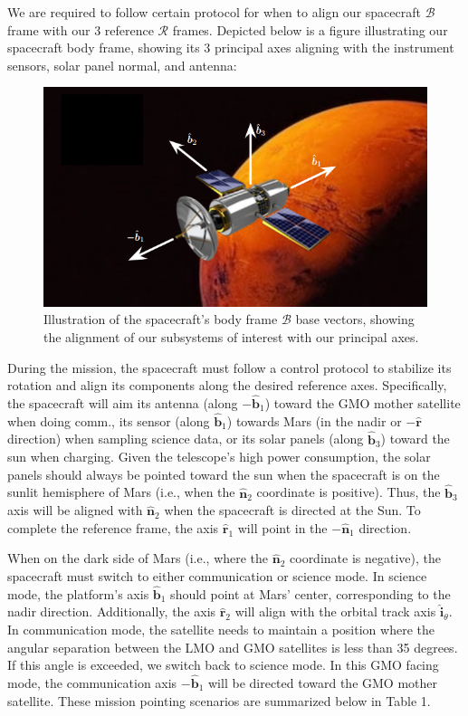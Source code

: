 \documentclass[conf]{new-aiaa}
\begin{document}
We are required to follow certain protocol for when to align our spacecraft $\mathcal{B}$ frame with our 3 reference $\mathcal{R}$ frames. Depicted below is a figure illustrating our spacecraft body frame, showing its 3 principal axes aligning with the instrument sensors, solar panel normal, and antenna:
\begin{figure}[H]
    \centering
    \captionsetup{width=.7\linewidth}
    \includegraphics[width=.75\linewidth]{fig2.png}
    \caption{Illustration of the spacecraft's body frame $\mathcal{B}$ base vectors, showing the alignment of our subsystems of interest with our principal axes.}
    \label{fig:enter-label}
\end{figure}
During the mission, the spacecraft must follow a control protocol to stabilize its rotation and align its components along the desired reference axes. Specifically, the spacecraft will aim its antenna (along \( -\hat{\bm{b}}_1 \)) toward the GMO mother satellite when doing comm., its sensor (along \( \hat{\bm{b}}_1 \)) towards Mars (in the nadir or \( -\hat{\bm{r}} \) direction) when sampling science data, or its solar panels (along \( \hat{\bm{b}}_3 \)) toward the sun when charging. Given the telescope's high power consumption, the solar panels should always be pointed toward the sun when the spacecraft is on the sunlit hemisphere of Mars (i.e., when the \( \hat{\bm{n}}_2 \) coordinate is positive). Thus, the \( \hat{\bm{b}}_3 \) axis will be aligned with \( \hat{\bm{n}}_2 \) when the spacecraft is directed at the Sun. To complete the reference frame, the axis \( \hat{\bm{r}}_1 \) will point in the \( -\hat{\bm{n}}_1 \) direction.

When on the dark side of Mars (i.e., where the \( \hat{\bm{n}}_2 \) coordinate is negative), the spacecraft must switch to either communication or science mode. In science mode, the platform’s axis \( \hat{\bm{b}}_1 \) should point at Mars’ center, corresponding to the nadir direction. Additionally, the axis \( \hat{\bm{r}}_2 \) will align with the orbital track axis \( \hat{\bm{i}}_{\theta} \). In communication mode, the satellite needs to maintain a position where the angular separation between the LMO and GMO satellites is less than 35 degrees. If this angle is exceeded, we switch back to science mode. In this GMO facing mode, the communication axis \( -\hat{\bm{b}}_1 \) will be directed toward the GMO mother satellite. These mission pointing scenarios are summarized below in Table 1.
\end{document}
